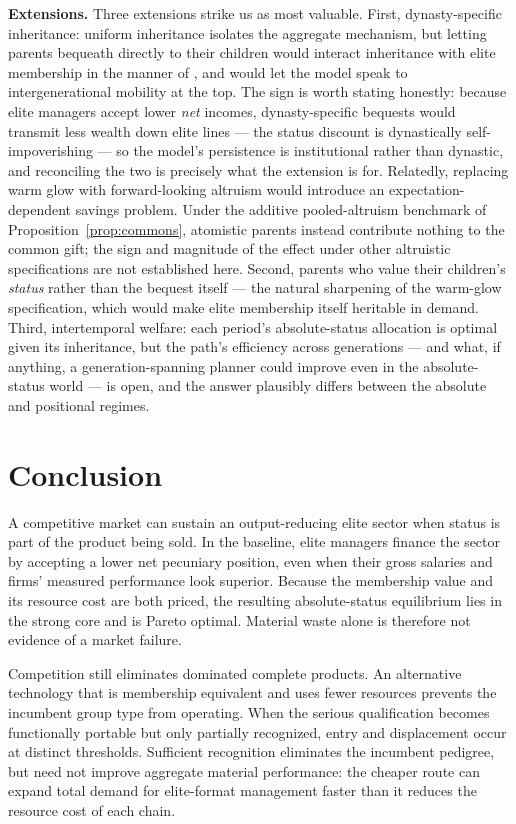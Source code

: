 \documentclass[12pt,letterpaper]{article}
\theoremstyle{definition}
\begin{document}
\textbf{Extensions.}
Three extensions strike us as most valuable.
First, dynasty-specific inheritance: uniform inheritance isolates the aggregate mechanism, but letting parents bequeath directly to their children would interact inheritance with elite membership in the manner of \citet{galorzeira1993}, and would let the model speak to intergenerational mobility at the top.
The sign is worth stating honestly: because elite managers accept lower \emph{net} incomes, dynasty-specific bequests would transmit less wealth down elite lines --- the status discount is dynastically self-impoverishing --- so the model's persistence is institutional rather than dynastic, and reconciling the two is precisely what the extension is for.
Relatedly, replacing warm glow with forward-looking altruism would introduce an expectation-dependent savings problem.
Under the additive pooled-altruism benchmark of Proposition~\ref{prop:commons}, atomistic parents instead contribute nothing to the common gift; the sign and magnitude of the effect under other altruistic specifications are not established here.
Second, parents who value their children's \emph{status} rather than the bequest itself --- the natural sharpening of the warm-glow specification, which would make elite membership itself heritable in demand.
Third, intertemporal welfare: each period's absolute-status allocation is optimal given its inheritance, but the path's efficiency across generations --- and what, if anything, a generation-spanning planner could improve even in the absolute-status world --- is open, and the answer plausibly differs between the absolute and positional regimes.

\section{Conclusion}\label{sec:conclusion}

A competitive market can sustain an output-reducing elite sector when status is part of
the product being sold.
In the baseline, elite managers finance the sector by accepting a lower net pecuniary
position, even when their gross salaries and firms' measured performance look superior.
Because the membership value and its resource cost are both priced, the resulting
absolute-status equilibrium lies in the strong core and is Pareto optimal.
Material waste alone is therefore not evidence of a market failure.

Competition still eliminates dominated complete products.
An alternative technology that is membership equivalent and uses fewer resources
prevents the incumbent group type from operating.
When the serious qualification becomes functionally portable but only partially
recognized, entry and displacement occur at distinct thresholds.
Sufficient recognition eliminates the incumbent pedigree, but need not improve aggregate
material performance: the cheaper route can expand total demand for elite-format
management faster than it reduces the resource cost of each chain.
\end{document}
